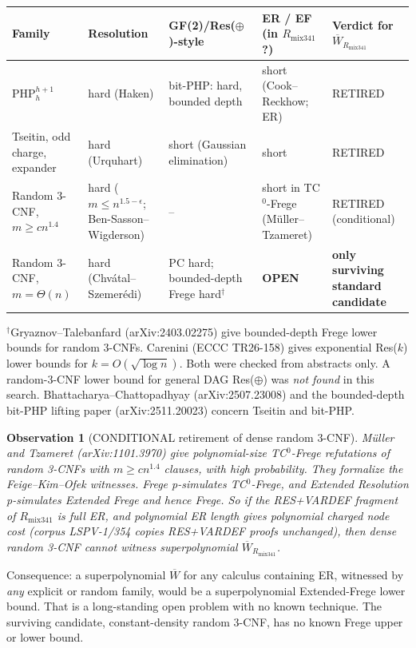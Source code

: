 \documentclass[11pt]{article}
\newtheorem{observation}{Observation}
\begin{document}
\begin{center}\small
\begin{tabular}{@{}lllll@{}}
\toprule
Family & Resolution & GF(2)/Res($\oplus$)-style & ER / EF (in $R_{\mathrm{mix341}}$?) & Verdict for $\overline W_{R_{\mathrm{mix341}}}$\\
\midrule
PHP$^{h+1}_h$ & hard (Haken) & bit-PHP: hard, bounded depth & short (Cook--Reckhow; ER) & RETIRED\\
Tseitin, odd charge, expander & hard (Urquhart) & short (Gaussian elimination) & short & RETIRED\\
Random 3-CNF, $m\ge c n^{1.4}$ & hard ($m\le n^{1.5-\epsilon}$; Ben-Sasson--Wigderson) & -- & short in TC$^0$-Frege (M\"uller--Tzameret) & RETIRED (conditional)\\
Random 3-CNF, $m=\Theta(n)$ & hard (Chv\'atal--Szemer\'edi) & PC hard; bounded-depth Frege hard$^\dagger$ & \textbf{OPEN} & \textbf{only surviving standard candidate}\\
\bottomrule
\end{tabular}
\end{center}
\noindent$^\dagger$Gryaznov--Talebanfard (arXiv:2403.02275) give bounded-depth Frege lower bounds for random 3-CNFs. Carenini (ECCC TR26-158) gives exponential Res($k$) lower bounds for $k=O(\sqrt{\log n})$. Both were checked from abstracts only. A random-3-CNF lower bound for general DAG Res($\oplus$) was \emph{not found} in this search. Bhattacharya--Chattopadhyay (arXiv:2507.23008) and the bounded-depth bit-PHP lifting paper (arXiv:2511.20023) concern Tseitin and bit-PHP.

\begin{observation}[CONDITIONAL retirement of dense random 3-CNF]
M\"uller and Tzameret (arXiv:1101.3970) give polynomial-size TC$^0$-Frege refutations of random 3-CNFs with $m\ge c n^{1.4}$ clauses, with high probability. They formalize the Feige--Kim--Ofek witnesses. Frege p-simulates TC$^0$-Frege, and Extended Resolution p-simulates Extended Frege and hence Frege. So if the RES+VARDEF fragment of $R_{\mathrm{mix341}}$ is full ER, and polynomial ER length gives polynomial charged node cost (corpus LSPV-1/354 copies RES+VARDEF proofs unchanged), then dense random 3-CNF cannot witness superpolynomial $\overline W_{R_{\mathrm{mix341}}}$.
\end{observation}
\noindent Consequence: a superpolynomial $\overline W$ for any calculus containing ER, witnessed by \emph{any} explicit or random family, would be a superpolynomial Extended-Frege lower bound. That is a long-standing open problem with no known technique. The surviving candidate, constant-density random 3-CNF, has no known Frege upper or lower bound.
\end{document}
